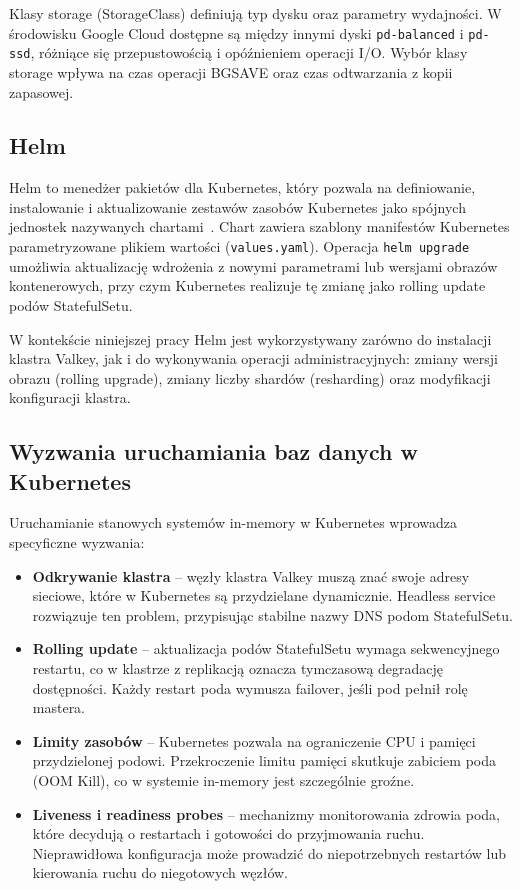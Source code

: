 Klasy storage (StorageClass) definiują typ dysku oraz parametry wydajności. W środowisku Google Cloud dostępne są między innymi dyski \texttt{pd-balanced} i \texttt{pd-ssd}, różniące się przepustowością i opóźnieniem operacji I/O. Wybór klasy storage wpływa na czas operacji BGSAVE oraz czas odtwarzania z kopii zapasowej.

\subsection{Helm}

Helm to menedżer pakietów dla Kubernetes, który pozwala na definiowanie, instalowanie i aktualizowanie zestawów zasobów Kubernetes jako spójnych jednostek nazywanych chartami~\cite{helmDocumentation}. Chart zawiera szablony manifestów Kubernetes parametryzowane plikiem wartości (\texttt{values.yaml}). Operacja \texttt{helm upgrade} umożliwia aktualizację wdrożenia z nowymi parametrami lub wersjami obrazów kontenerowych, przy czym Kubernetes realizuje tę zmianę jako rolling update podów StatefulSetu.

W kontekście niniejszej pracy Helm jest wykorzystywany zarówno do instalacji klastra Valkey, jak i do wykonywania operacji administracyjnych: zmiany wersji obrazu (rolling upgrade), zmiany liczby shardów (resharding) oraz modyfikacji konfiguracji klastra.

\subsection{Wyzwania uruchamiania baz danych w Kubernetes}

Uruchamianie stanowych systemów in-memory w Kubernetes wprowadza specyficzne wyzwania:

\begin{itemize}
    \item \textbf{Odkrywanie klastra} -- węzły klastra Valkey muszą znać swoje adresy sieciowe, które w Kubernetes są przydzielane dynamicznie. Headless service rozwiązuje ten problem, przypisując stabilne nazwy DNS podom StatefulSetu.
    \item \textbf{Rolling update} -- aktualizacja podów StatefulSetu wymaga sekwencyjnego restartu, co w klastrze z replikacją oznacza tymczasową degradację dostępności. Każdy restart poda wymusza failover, jeśli pod pełnił rolę mastera.
    \item \textbf{Limity zasobów} -- Kubernetes pozwala na ograniczenie CPU i pamięci przydzielonej podowi. Przekroczenie limitu pamięci skutkuje zabiciem poda (OOM Kill), co w systemie in-memory jest szczególnie groźne.
    \item \textbf{Liveness i readiness probes} -- mechanizmy monitorowania zdrowia poda, które decydują o restartach i gotowości do przyjmowania ruchu. Nieprawidłowa konfiguracja może prowadzić do niepotrzebnych restartów lub kierowania ruchu do niegotowych węzłów.
\end{itemize}

